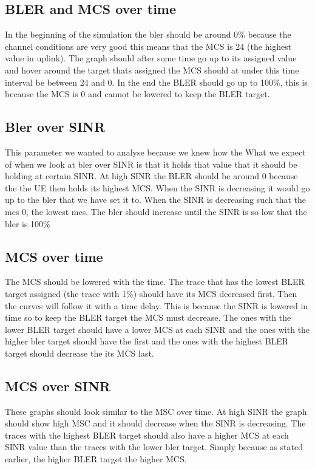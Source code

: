 \documentclass[cropmarks, frame, english]{idamasterthesis}
\begin{document}
\subsection{BLER and MCS over time}
In the beginning of the simulation the bler should be around 0\% because the channel conditions are very good this means that the MCS is 24 (the highest value in uplink). The graph should after some time go up to its assigned value and hover around the target thats assigned the MCS should at under this time interval be between 24 and 0. In the end the BLER should go up to 100\%, this is because the MCS is 0 and cannot be lowered to keep the BLER target.

\subsection{Bler over SINR}
This parameter we wanted to analyse because we knew how the
What we expect of when we look at bler over SINR is that it holds that value that it should be holding at certain SINR. At high SINR the BLER should be around 0 because the the UE then holds its highest MCS. When the SINR is decreasing it would go up to the bler that we have set it to. When the SINR is decreasing such that the mcs 0, the lowest mcs. The bler should increase until the SINR is so low that the bler is 100\%


\subsection{MCS over time}
The MCS should be lowered with the time. The trace that has the lowest BLER target assigned (the trace with 1\%) should have its MCS decreased first. Then the curves will follow it with a time delay. This is because the SINR is lowered in time so to keep the BLER target the MCS must decrease. The ones with the lower BLER target should have a lower MCS at each SINR and the ones with the higher bler target should have the first and the ones with the highest BLER target should decrease the its MCS last.


\subsection{MCS over SINR}
These graphs should look similar to the MSC over time. At high SINR the graph should show high MSC and it should decrease when the SINR is decreasing. The traces with the highest BLER target should also have a higher MCS at each SINR value than the traces with the lower bler target. Simply because as stated earlier, the higher BLER target the higher MCS.
\end{document}
